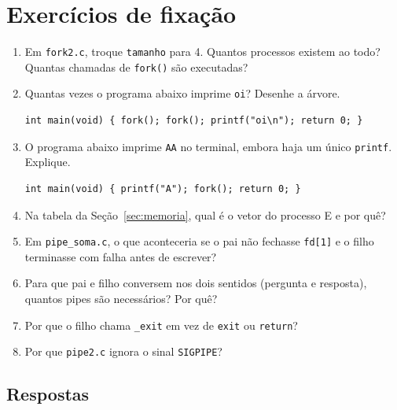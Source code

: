 \documentclass[11pt,a4paper]{article}
\newcommand{\cmd}[1]{\texttt{#1}}
\begin{document}
\section{Exercícios de fixação}

\begin{enumerate}
    \item Em \cmd{fork2.c}, troque \cmd{tamanho} para 4. Quantos processos existem ao todo? Quantas chamadas de \cmd{fork()} são executadas?
    \item Quantas vezes o programa abaixo imprime \cmd{oi}? Desenhe a árvore.
\begin{lstlisting}[style=codigo]
int main(void) { fork(); fork(); printf("oi\n"); return 0; }
\end{lstlisting}
    \item O programa abaixo imprime \cmd{AA} no terminal, embora haja um único \cmd{printf}. Explique.
\begin{lstlisting}[style=codigo]
int main(void) { printf("A"); fork(); return 0; }
\end{lstlisting}
    \item Na tabela da Seção~\ref{sec:memoria}, qual é o vetor do processo E e por quê?
    \item Em \cmd{pipe\_soma.c}, o que aconteceria se o pai não fechasse \cmd{fd[1]} e o filho terminasse com falha antes de escrever?
    \item Para que pai e filho conversem nos dois sentidos (pergunta e resposta), quantos pipes são necessários? Por quê?
    \item Por que o filho chama \cmd{\_exit} em vez de \cmd{exit} ou \cmd{return}?
    \item Por que \cmd{pipe2.c} ignora o sinal \cmd{SIGPIPE}?
\end{enumerate}

\subsection*{Respostas}
\end{document}
